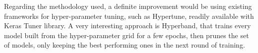 Regarding the methodology used, a definite improvement would be using existing
frameworks for hyper-parameter tuning, such as Hypertune, readily available
with Keras Tuner library. A very interesting approach is Hyperband, that trains
every model built from the hyper-parameter grid for a few epochs, then prunes
the set of models, only keeping the best performing ones in the next round of
training.


